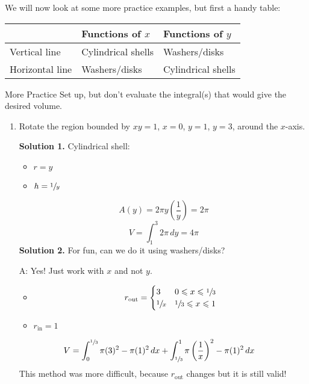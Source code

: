 We will now look at some more practice examples, but first a handy table:

\begin{table}[H]
    \centering
    \begin{tabularx}{0.7\linewidth}{@{}YYY@{}}
                        & Functions of $ x $ & Functions of $ y $ \\
        \midrule
        Vertical line   & Cylindrical shells & Washers/disks      \\
        Horizontal line & Washers/disks      & Cylindrical shells
    \end{tabularx}
\end{table}

\begin{Example}{More Practice}{}
    Set up, but don't evaluate the integral(s) that would give
    the desired volume.

    \begin{enumerate}[label=(\roman*)]
        \item Rotate the region bounded by $ xy=1 $, $ x=0 $, $ y=1 $, $ y=3 $,
              around the $ x $-axis.

              \textbf{Solution 1.} Cylindrical shell:
              \begin{itemize}
                  \item $ r=y $
                  \item $ h=\sfrac{1}{y} $
              \end{itemize}
              \[ A(y)=2\pi y\left( \frac{1}{y}  \right)=2\pi \]
              \[ V=\int_{1}^{3} 2\pi\, d{y}=4\pi \]
              \textbf{Solution 2.} For fun, can we do it using washers/disks?

              A\@: Yes! Just work with $ x $ and not $ y $.
              \begin{itemize}
                  \item \[ r_{\text{out}}=\begin{cases}
                                3            & 0\leqslant x\leqslant \sfrac{1}{3}   \\
                                \sfrac{1}{x} & \sfrac{1}{3} \leqslant x \leqslant 1
                            \end{cases} \]
                  \item $ r_{\text{in}}=1 $
              \end{itemize}
              \begin{align*}
                  V
                   & =\int_{0}^{\sfrac{1}{3}} \pi(3)^2-\pi(1)^2\, d{x}
                  +\int_{\sfrac{1}{3}}^{1} \pi\left( \frac{1}{x} \right)^2-\pi(1)^2\, d{x}
              \end{align*}
              This method was more difficult, because $ r_{\text{out}} $ changes but it is still valid!


\end{enumerate}
\end{Example}
